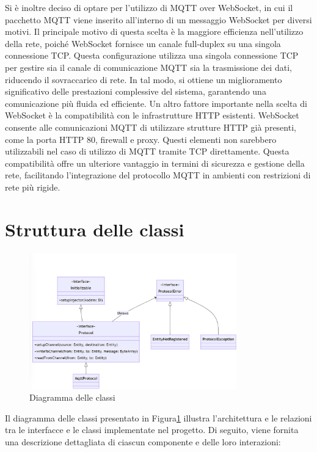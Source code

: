 \documentclass[12pt,a4paper,openright,twoside]{book}
\begin{document}
Si è inoltre deciso di optare per l'utilizzo di \ac{MQTT} over WebSocket, in cui il pacchetto \ac{MQTT} viene inserito all'interno di un messaggio WebSocket per diversi motivi.
Il principale motivo di questa scelta è la maggiore efficienza nell'utilizzo della rete, poiché WebSocket fornisce un canale full-duplex su una singola connessione \ac{TCP}. 
Questa configurazione utilizza una singola connessione TCP per gestire sia il canale di comunicazione MQTT sia la trasmissione dei dati, riducendo il sovraccarico di rete. 
In tal modo, si ottiene un miglioramento significativo delle prestazioni complessive del sistema, garantendo una comunicazione più fluida ed efficiente.
Un altro fattore importante nella scelta di WebSocket è la compatibilità con le infrastrutture HTTP esistenti. WebSocket consente alle comunicazioni \ac{MQTT} 
di utilizzare strutture HTTP già presenti, come la porta HTTP 80, firewall e proxy. Questi elementi non sarebbero utilizzabili nel caso di utilizzo di \ac{MQTT} tramite 
\ac{TCP} direttamente. Questa compatibilità offre un ulteriore vantaggio in termini di sicurezza e gestione della rete, facilitando l'integrazione del protocollo \ac{MQTT} 
in ambienti con restrizioni di rete più rigide.

\section{Struttura delle classi}

\begin{figure}[H]
    \centering
    \includegraphics[width=0.8\textwidth]{figures/class-diagram.png}
    \caption{Diagramma delle classi}
    \label{fig:class-diagram}
\end{figure}

Il diagramma delle classi presentato in Figura\ref{fig:class-diagram} illustra l'architettura e le relazioni tra le interfacce e le classi implementate nel progetto. 
Di seguito, viene fornita una descrizione dettagliata di ciascun componente e delle loro interazioni:
\end{document}
